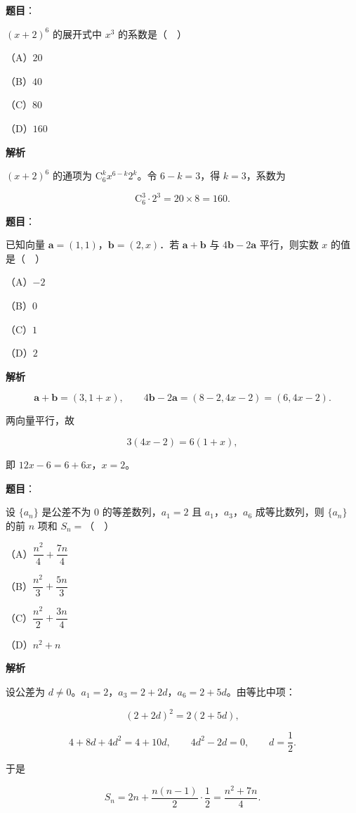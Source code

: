 \begin{answer}

\textbf{题目}：

$(x+2)^6$ 的展开式中 $x^3$ 的系数是（　）

（A）$20$

（B）$40$

（C）$80$

（D）$160$

\textbf{解析}

$(x+2)^6$ 的通项为 $\mathrm C_6^k x^{6-k}2^k$。令 $6-k=3$，得 $k=3$，系数为

\nopagebreak[4]
\[\mathrm C_6^3\cdot2^3=20\times8=160.\]


\end{answer}
\begin{answer}

\textbf{题目}：

已知向量 $\boldsymbol a=(1,1)$，$\boldsymbol b=(2,x)$．若 $\boldsymbol a+\boldsymbol b$ 与 $4\boldsymbol b-2\boldsymbol a$ 平行，则实数 $x$ 的值是（　）

（A）$-2$

（B）$0$

（C）$1$

（D）$2$

\textbf{解析}

\nopagebreak[4]
\[\boldsymbol a+\boldsymbol b=(3,1+x),\qquad 4\boldsymbol b-2\boldsymbol a=(8-2,4x-2)=(6,4x-2).\]

两向量平行，故

\nopagebreak[4]
\[3(4x-2)=6(1+x),\]

即 $12x-6=6+6x$，$x=2$。


\end{answer}
\begin{answer}

\textbf{题目}：

设 $\{a_n\}$ 是公差不为 $0$ 的等差数列，$a_1=2$ 且 $a_1$，$a_3$，$a_6$ 成等比数列，则 $\{a_n\}$ 的前 $n$ 项和 $S_n=$（　）

（A）$\dfrac{n^2}4+\dfrac{7n}4$

（B）$\dfrac{n^2}3+\dfrac{5n}3$

（C）$\dfrac{n^2}2+\dfrac{3n}4$

（D）$n^2+n$

\textbf{解析}

设公差为 $d\neq0$。$a_1=2$，$a_3=2+2d$，$a_6=2+5d$。由等比中项：

\nopagebreak[4]
\[(2+2d)^2=2(2+5d),\]

\nopagebreak[4]
\[4+8d+4d^2=4+10d,\qquad 4d^2-2d=0,\qquad d=\frac12.\]

于是

\nopagebreak[4]
\[S_n=2n+\frac{n(n-1)}2\cdot\frac12=\frac{n^2+7n}4.\]


\end{answer}
